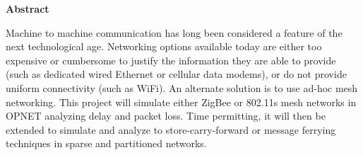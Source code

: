 \begin{center}
\textbf{Abstract}
\end{center}

Machine to machine communication has long been considered a feature of the next technological age. 
Networking options available today are either too expensive or cumbersome to justify the information they are able to provide (such as dedicated wired Ethernet or cellular data modems), or do not provide uniform connectivity (such as WiFi). 
An alternate solution is to use ad-hoc mesh networking. 
This project will simulate either ZigBee or 802.11s mesh networks in OPNET analyzing delay and packet loss. 
Time permitting, it will then be extended to simulate and analyze to store-carry-forward or message ferrying techniques in sparse and partitioned networks.
